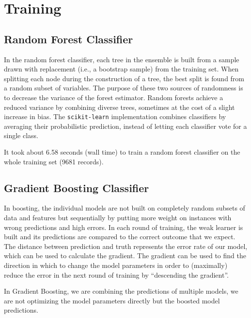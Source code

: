 \documentclass[11pt]{article}
\begin{document}
\section{Training}

\subsection{ Random Forest Classifier}
In the random forest classifier, each tree in the ensemble is built from a sample drawn with replacement (i.e., a bootstrap sample) from the training set\cite{ho1998random}. When splitting each node during the construction of a tree, the best split is found from a random subset of variables\cite{ho1998random}. The purpose of these two sources of randomness is to decrease the variance of the forest estimator\cite{ho1998random}. Random forests achieve a reduced variance by combining diverse trees, sometimes at the cost of a slight increase in bias\cite{ho1998random}. The \texttt{scikit-learn} implementation combines classifiers by averaging their probabilistic prediction, instead of letting each classifier vote for a single class\cite{scikit-learn}.

It took about 6.58 seconds (wall time) to train a random forest classifier on the whole training set (9681 records).

\subsection{ Gradient Boosting Classifier }

In boosting, the individual models are not built on completely random subsets of data and features but sequentially by putting more weight on instances with wrong predictions and high errors\cite{friedman2002stochastic}. In each round of training, the weak learner is built and its predictions are compared to the correct outcome that we expect\cite{friedman2002stochastic}. The distance between prediction and truth represents the error rate of our model, which can be used to calculate the gradient\cite{friedman2002stochastic}. The gradient can be used to find the direction in which to change the model parameters in order to (maximally) reduce the error in the next round of training by “descending the gradient”\cite{friedman2002stochastic}.

In Gradient Boosting, we are combining the predictions of multiple models, we are not optimizing the model parameters directly but the boosted model predictions\cite{friedman2002stochastic}. 
\end{document}

